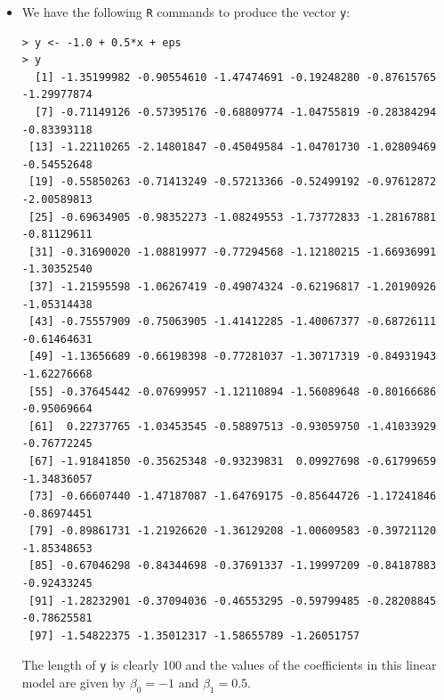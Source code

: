 \begin{itemize}
\begin{lstlisting}
 [46] -0.046926188  0.130447909  0.001087226 -0.080393783 -0.102537846
 [51]  0.028136694 -0.001159990 -0.019879273 -0.058085134 -0.092966269
 [56] -0.067199519  0.062501800 -0.038829168 -0.086526678  0.116830664
 [61]  0.026568774 -0.014915444  0.066155191  0.055401416 -0.038702691
 [66]  0.137881404 -0.015939189 -0.089030916 -0.009024975  0.012971146
 [71]  0.144248650  0.006612648  0.028562425 -0.004822058 -0.020875053
 [76] -0.002170377  0.049227475  0.129702813  0.064212027  0.075494275
 [81] -0.076957714  0.061493473  0.013745300 -0.091703127  0.032563921
 [86] -0.009922163  0.091536707 -0.047880125 -0.026888235 -0.057881844
 [91] -0.011068998  0.025125736 -0.045734261  0.051898323 -0.075505174
 [96] -0.065499026  0.090072357 -0.063490467  0.025748420 -0.023817253
        \end{lstlisting}
    \item[(c)] We have the following \verb|R| commands to produce the vector
        \verb|y|:
        \begin{lstlisting}
> y <- -1.0 + 0.5*x + eps
> y
  [1] -1.35199982 -0.90554610 -1.47474691 -0.19248280 -0.87615765 -1.29977874
  [7] -0.71149126 -0.57395176 -0.68809774 -1.04755819 -0.28384294 -0.83393118
 [13] -1.22110265 -2.14801847 -0.45049584 -1.04701730 -1.02809469 -0.54552648
 [19] -0.55850263 -0.71413249 -0.57213366 -0.52499192 -0.97612872 -2.00589813
 [25] -0.69634905 -0.98352273 -1.08249553 -1.73772833 -1.28167881 -0.81129611
 [31] -0.31690020 -1.08819977 -0.77294568 -1.12180215 -1.66936991 -1.30352540
 [37] -1.21595598 -1.06267419 -0.49074324 -0.62196817 -1.20190926 -1.05314438
 [43] -0.75557909 -0.75063905 -1.41412285 -1.40067377 -0.68726111 -0.61464631
 [49] -1.13656689 -0.66198398 -0.77281037 -1.30717319 -0.84931943 -1.62276668
 [55] -0.37645442 -0.07699957 -1.12110894 -1.56089648 -0.80166686 -0.95069664
 [61]  0.22737765 -1.03453545 -0.58897513 -0.93059750 -1.41033929 -0.76772245
 [67] -1.91841850 -0.35625348 -0.93239831  0.09927698 -0.61799659 -1.34836057
 [73] -0.66607440 -1.47187087 -1.64769175 -0.85644726 -1.17241846 -0.86974451
 [79] -0.89861731 -1.21926620 -1.36129208 -1.00609583 -0.39721120 -1.85348653
 [85] -0.67046298 -0.84344698 -0.37691337 -1.19997209 -0.84187883 -0.92433245
 [91] -1.28232901 -0.37094036 -0.46553295 -0.59799485 -0.28208845 -0.78625581
 [97] -1.54822375 -1.35012317 -1.58655789 -1.26051757
        \end{lstlisting}
        The length of \verb|y| is clearly 100 and the values of the
        coefficients in this linear model are given by $\beta_0 = -1$
        and $\beta_1 = 0.5$.

\end{itemize}

